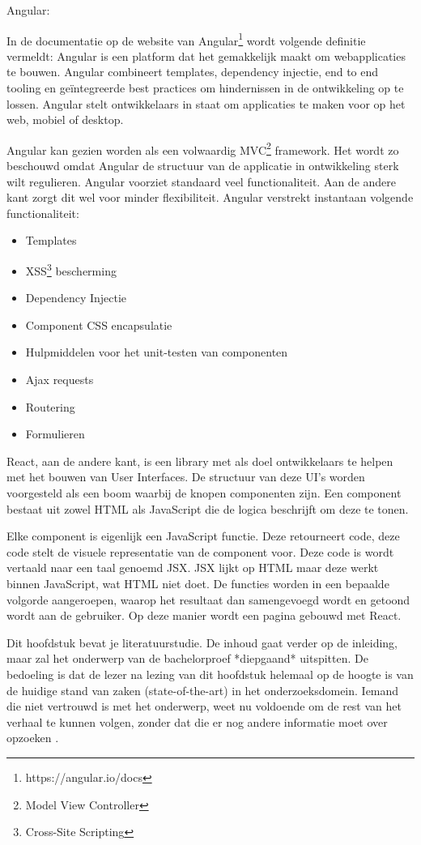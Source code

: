 Angular:

In de documentatie op de website van Angular\footnote{https://angular.io/docs} wordt volgende definitie vermeldt: Angular is een platform dat het gemakkelijk maakt om webapplicaties te bouwen. Angular combineert templates, dependency injectie, end to end tooling en geïntegreerde best practices om hindernissen in de ontwikkeling op te lossen. Angular stelt ontwikkelaars in staat om applicaties te maken voor op het web, mobiel of desktop.

Angular kan gezien worden als een volwaardig MVC\footnote{Model View Controller} framework. Het wordt zo beschouwd omdat Angular de structuur van de applicatie in ontwikkeling sterk wilt regulieren. Angular voorziet standaard veel functionaliteit. Aan de andere kant zorgt dit wel voor minder flexibiliteit. Angular verstrekt instantaan volgende functionaliteit:
\begin{itemize}
	\item Templates
	\item XSS\footnote{Cross-Site Scripting} bescherming
	\item Dependency Injectie
	\item Component CSS encapsulatie
	\item Hulpmiddelen voor het unit-testen van componenten
	\item Ajax requests
	\item Routering
	\item Formulieren
\end{itemize}

React, aan de andere kant, is een library met als doel ontwikkelaars te helpen met het bouwen van User Interfaces. De structuur van deze UI's worden voorgesteld als een boom waarbij de knopen componenten zijn. Een component bestaat uit zowel HTML als JavaScript die de logica beschrijft om deze te tonen. \autocite{Baer2018}

Elke component is eigenlijk een JavaScript functie. Deze retourneert code, deze code stelt de visuele representatie van de component voor. Deze code is wordt vertaald naar een taal genoemd JSX. JSX lijkt op HTML maar deze werkt binnen JavaScript, wat HTML niet doet. De functies worden in een bepaalde volgorde aangeroepen, waarop het resultaat dan samengevoegd wordt en getoond wordt aan de gebruiker. Op deze manier wordt een pagina gebouwd met React.  \autocite{Domes2017}






Dit hoofdstuk bevat je literatuurstudie. De inhoud gaat verder op de inleiding, maar zal het onderwerp van de bachelorproef *diepgaand* uitspitten. De bedoeling is dat de lezer na lezing van dit hoofdstuk helemaal op de hoogte is van de huidige stand van zaken (state-of-the-art) in het onderzoeksdomein. Iemand die niet vertrouwd is met het onderwerp, weet nu voldoende om de rest van het verhaal te kunnen volgen, zonder dat die er nog andere informatie moet over opzoeken \autocite{Pollefliet2011}.

